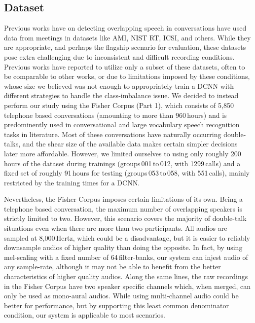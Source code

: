 \documentclass[a4paper]{article}
\begin{document}
\subsection{Dataset} \label{sec:dataset}
Previous works have on detecting overlapping speech in conversations have used data from meetings in datasets like AMI, NIST RT, ICSI, and others.  %
While they are appropriate, and perhaps the flagship scenario for evaluation,
these datasets pose extra challenging due to inconsistent and difficult recording conditions.
Previous works have reported to utilize only a subset of these datasets,
often to be comparable to other works,  %
or due to limitations imposed by these conditions,
whose size we believed was not enough to appropriately train a DCNN with different strategies to handle the class-imbalance issue.
We decided to instead perform our study using the Fisher Corpus (Part 1),  %
which consists of 5,850 telephone based conversations (amounting to more than 960\,hours) and is predominently used in conversational and large vocabulary speech recognition tasks in literature.  %
Most of these conversations have naturally occurring double-talks,
and the shear size of the available data makes certain simpler decisions later more affordable.
However, we limited ourselves to using only roughly 200\,hours of the dataset during trainings
(groups\,001\,to\,012, with 1299\,calls) and a fixed set of roughly 91\,hours for testing
(groups\,053\,to\,058, with 551\,calls),
mainly restricted by the training times for a DCNN.

Nevertheless, the Fisher Corpus imposes certain limitations of its own.
Being a telephone based conversation, the maximum number of overlapping speakers is strictly limited to two.
However, this scenario covers the majority of double-talk situations even when there are more than two participants.  %
All audios are sampled at 8,000\,Hertz, which could be a disadvantage,
but it is easier to reliably downsample audios of higher quality than doing the opposite.
In fact, by using mel-scaling with a fixed number of 64\,filter-banks,
our system can injest audio of any sample-rate,
although it may not be able to benefit from the better characteristics of higher quality audios.
Along the same lines, the raw recordings in the Fisher Corpus have two speaker specific channels which, when merged,
can only be used as mono-aural audios.
While using multi-channel audio could be better for performance,
but by supporting this least common denominator condition,
our system is applicable to most scenarios.
\end{document}
